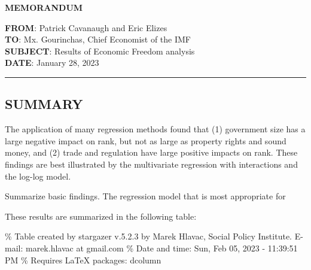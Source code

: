 \documentclass[
  11pt,
]{article}
\author{}
\date{\vspace{-2.5em}}
\begin{document}
\begin{center}\textbf{MEMORANDUM}\end{center}

\textbf{FROM}: Patrick Cavanaugh and Eric Elizes\\
\textbf{TO}: Mx. Gourinchas, Chief Economist of the IMF\\
\textbf{SUBJECT}: Results of Economic Freedom analysis\\
\textbf{DATE}: January 28, 2023

\par

\noindent

\rule{\textwidth}{0.4pt}

\hypertarget{summary}{%
\subsection{SUMMARY}\label{summary}}

The application of many regression methods found that (1) government
size has a large negative impact on rank, but not as large as property
rights and sound money, and (2) trade and regulation have large positive
impacts on rank. These findings are best illustrated by the multivariate
regression with interactions and the log-log model.

Summarize basic findings. The regression model that is most appropriate
for

These results are summarized in the following table:

\% Table created by stargazer v.5.2.3 by Marek Hlavac, Social Policy
Institute. E-mail: marek.hlavac at gmail.com \% Date and time: Sun, Feb
05, 2023 - 11:39:51 PM \% Requires LaTeX packages: dcolumn
\end{document}
